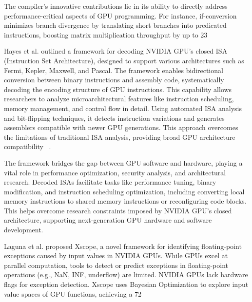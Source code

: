 The compiler's innovative contributions lie in its ability to directly address performance-critical aspects of GPU programming. For instance, if-conversion minimizes branch divergence by translating short branches into predicated instructions, boosting matrix multiplication throughput by up to 23%

Hayes et al. outlined a framework for decoding NVIDIA GPU's closed ISA (Instruction Set Architecture), designed to support various architectures such as Fermi, Kepler, Maxwell, and Pascal. The framework enables bidirectional conversion between binary instructions and assembly code, systematically decoding the encoding structure of GPU instructions. This capability allows researchers to analyze microarchitectural features like instruction scheduling, memory management, and control flow in detail. Using automated ISA analysis and bit-flipping techniques, it detects instruction variations and generates assemblers compatible with newer GPU generations. This approach overcomes the limitations of traditional ISA analysis, providing broad GPU architecture compatibility ~\cite{Hayes2019}.

The framework bridges the gap between GPU software and hardware, playing a vital role in performance optimization, security analysis, and architectural research. Decoded ISAs facilitate tasks like performance tuning, binary modification, and instruction scheduling optimization, including converting local memory instructions to shared memory instructions or reconfiguring code blocks. This helps overcome research constraints imposed by NVIDIA GPU's closed architecture, supporting next-generation GPU hardware and software development.

Laguna et al. proposed Xscope, a novel framework for identifying floating-point exceptions caused by input values in NVIDIA GPUs. While GPUs excel at parallel computation, tools to detect or predict exceptions in floating-point operations (e.g., NaN, INF, underflow) are limited. NVIDIA GPUs lack hardware flags for exception detection. Xscope uses Bayesian Optimization to explore input value spaces of GPU functions, achieving a 72%

